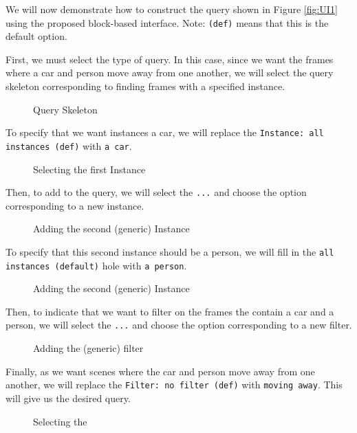 We will now demonstrate how to construct the query shown in Figure \ref{fig:UI1} using the proposed block-based interface. Note: \texttt{(def)} means that this is the default option.

First, we must select the type of query. In this case, since we want the frames where a car and person move away from one another, we will select the query skeleton corresponding to finding frames with a specified instance.
\begin{figure}[H]
    \caption{Query Skeleton}
    \label{fig:Using1}
\end{figure}
To specify that we want instances a car, we will replace the \texttt{Instance: all instances (def)} with \texttt{a car}.
\begin{figure}[H]
    \caption{Selecting the first Instance}
    \label{fig:Using2}
\end{figure}
Then, to add to the query, we will select the \texttt{...} and choose the option corresponding to a new instance.
\begin{figure}[H]
    \caption{Adding the second (generic) Instance}
    \label{fig:Using3}
\end{figure}
To specify that this second instance should be a person, we will fill in the \texttt{all instances (default)} hole with \texttt{a person}.
\begin{figure}[H]
    \caption{Adding the second (generic) Instance}
    \label{fig:Using4}
\end{figure}
Then, to indicate that we want to filter on the frames the contain a car and a person, we will select the \texttt{...} and choose the option corresponding to a new filter.
\begin{figure}[H]
    \caption{Adding the (generic) filter}
    \label{fig:Using5}
\end{figure}
Finally, as we want scenes where the car and person move away from one another, we will replace the \texttt{Filter: no filter (def)} with \texttt{moving away}. This will give us the desired query.

\begin{figure}[H]
    \caption{Selecting the }
    \label{fig:Using6}
\end{figure}
